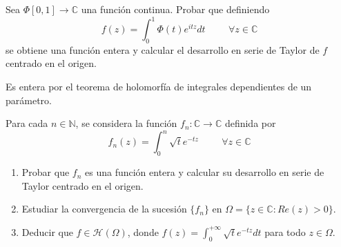 \begin{ejer}
	Sea $\Phi [0,1]\rightarrow\mathbb{C}$ una función continua. Probar que definiendo
	$$ f(z) = \int_{0}^{1} \Phi(t)e^{itz}dt \hspace{1cm} \forall z\in\mathbb{C} $$
	se obtiene una función entera y calcular el desarrollo en serie de Taylor de $f$ centrado en el origen.
\end{ejer}
\begin{sol}
Es entera por el teorema de holomorfía de integrales dependientes de un parámetro.
\end{sol}



\begin{ejer}
	Para cada $n\in\mathbb{N}$, se considera la función $f_n:\mathbb{C}\rightarrow\mathbb{C}$ definida por
	$$ f_n(z) = \int_{0}^{n} \sqrt{t}e^{-tz} \hspace{1cm} \forall z\in\mathbb{C} $$
	\begin{enumerate}[label=\alph*)]
		\item Probar que $f_n$ es una función entera y calcular su desarrollo en serie de Taylor centrado en el origen.
		\item Estudiar la convergencia de la sucesión $\{f_n\}$ en $\Omega = \{ z\in\mathbb{C} : Re(z)>0 \}$.
		\item Deducir que $f\in\mathcal{H}(\Omega)$, donde $f(z) = \int_{0}^{+\infty} \sqrt{t}e^{-tz}dt$ para todo $z\in\Omega$.
	\end{enumerate}
\end{ejer}

